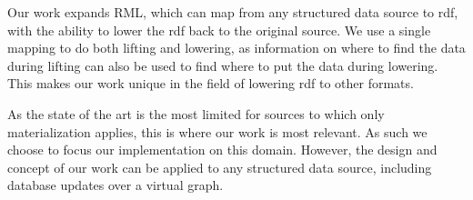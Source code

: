 Our work expands RML, which can map from any structured data source to \acrshort{rdf}, with the ability to lower the \acrshort{rdf} back to the original source. We use a single mapping to do both lifting and lowering, as information on where to find the data during lifting can also be used to find where to put the data during lowering. This makes our work unique in the field of lowering \acrshort{rdf} to other formats. 

As the state of the art is the most limited for sources to which only materialization applies, this is where our work is most relevant. As such we choose to focus our implementation on this domain. However, the design and concept of our work can be applied to any structured data source, including database updates over a virtual graph.
